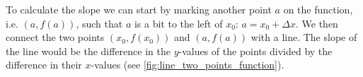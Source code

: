 To calculate the slope we can start by marking another point $a$ on the function, i.e. $\left(a,f\left(a\right)\right)$, such that $a$ is a bit to the left of $x_{0}$: $a=x_{0}+\Delta x$. We then connect the two points $\left(x_{0},f\left(x_{0}\right)\right)$ and $\left(a,f(a)\right)$ with a line. The slope of the line would be the difference in the $y$-values of the points divided by the difference in their $x$-values (see \autoref{fig:line_two_points_function}).

\begin{figure}
  \centering
  \caption{}
  \label{fig:line_two_points_function}
\end{figure}
